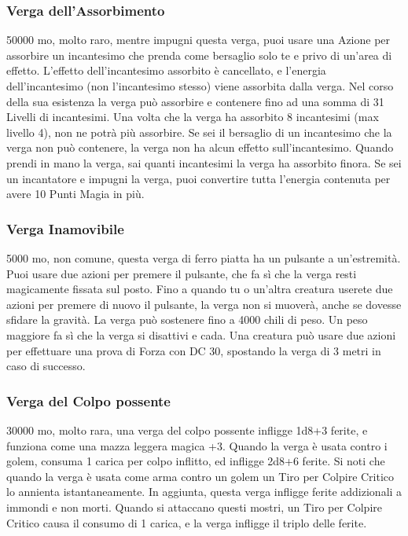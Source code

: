 \begin{multicols}{2}
\subsubsection*{Verga dell'Assorbimento}
50000 mo, molto raro, mentre impugni questa verga, puoi usare una Azione per assorbire un incantesimo che prenda come bersaglio solo te e privo di un'area di effetto. L'effetto dell'incantesimo assorbito è cancellato, e l'energia dell'incantesimo (non l'incantesimo stesso) viene assorbita dalla verga. Nel corso della sua esistenza la verga può assorbire e contenere fino ad una somma di 31 Livelli di incantesimi. Una volta che la verga ha assorbito 8 incantesimi (max livello 4), non ne potrà più assorbire. Se sei il bersaglio di un incantesimo che la verga non può contenere, la verga non ha alcun effetto sull'incantesimo. Quando prendi in mano la verga, sai quanti incantesimi la verga ha assorbito finora. Se sei un incantatore e impugni la verga, puoi convertire tutta l'energia contenuta per avere 10 Punti Magia in più.

\subsubsection*{Verga Inamovibile}
5000 mo, non comune, questa verga di ferro piatta ha un pulsante a un'estremità. Puoi usare due azioni per premere il pulsante, che fa sì che la verga resti magicamente fissata sul posto. Fino a quando tu o un'altra creatura userete due azioni per premere di nuovo il pulsante, la verga non si muoverà, anche se dovesse sfidare la gravità. La verga può sostenere fino a 4000 chili di peso. Un peso maggiore fa sì che la verga si disattivi e cada. Una creatura può usare due azioni per effettuare una prova di Forza con DC 30, spostando la verga di 3 metri in caso di successo.

\subsubsection*{Verga del Colpo possente}
30000 mo, molto rara, una verga del colpo possente infligge 1d8+3 ferite, e funziona come una mazza leggera magica +3. Quando la verga è usata contro i golem, consuma 1 carica per colpo inflitto, ed infligge 2d8+6 ferite. Si noti che quando la verga è usata come arma contro un golem un Tiro per Colpire Critico lo annienta istantaneamente. In aggiunta, questa verga infligge ferite addizionali a immondi e non morti. Quando si attaccano questi mostri, un Tiro per Colpire Critico causa il consumo di 1 carica, e la verga infligge il triplo delle ferite.


\end{multicols}
